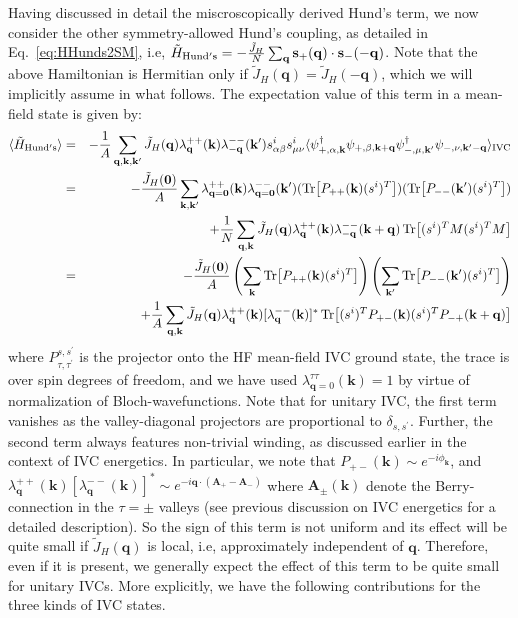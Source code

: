 \documentclass[aps,pra,twocolumn,superscriptaddress,10pt,article,nofootinbib,showpacs,longbibliography]{revtex4-1}
\def \k{{\mathbf k}}
\def \q{{\mathbf q}}
\def \s{{\mathbf s}}
\def \beq{\begin{eqnarray}}
\def \eeq{\end{eqnarray}}
\def \nn{\nonumber \\}
\begin{document}
Having discussed in detail the miscroscopically derived Hund's term, we now consider the other symmetry-allowed Hund's coupling, as detailed in Eq.~\eqref{eq:HHunds2SM}, i.e, $\tilde{H}_{\rm Hund's} = - \frac{\tilde{J}_H}{N} \sum_{\q} \s_{+}(\q) \cdot \s_{-}(-\q)$. 
Note that the above Hamiltonian is Hermitian only if $\tilde{J}_H(\q)= \tilde{J}_H(-\q)$, which we will implicitly assume in what follows. The expectation value of this term in a mean-field state is given by:
\beq
\langle \tilde{H}_{\rm Hund's} \rangle &=& - \frac{1}{A} \sum_{\q, \k, \k^\prime} \tilde{J}_H(\q) \lambda^{++}_\q(\k) \lambda^{--}_{-\q}(\k^\prime) s^i_{\alpha \beta} s^i_{\mu \nu} \langle \psi^\dagger_{+,\alpha,\k} \psi_{+,\beta, \k + \q} \psi^\dagger_{-,\mu,\k^\prime} \psi_{-,\nu,\k^\prime - \q} \rangle_{\rm IVC} \nn
& =& - \frac{\tilde{J}_H(\mathbf{0})}{A} \sum_{\k, \k^\prime} \lambda^{++}_{\q = \mathbf{0}}(\k) \lambda^{--}_{\q = \mathbf{0}}(\k^\prime)   (\Tr[P_{++}(\k)(s^i)^T] ) (\Tr[P_{--}(\k^\prime) (s^i)^T] ) \nn 
&& + \frac{1}{N} \sum_{\q, \k} \tilde{J}_H(\q) \lambda^{++}_{\q}(\k) \lambda^{--}_{-\q}(\k+\q) \Tr[(s^i)^T M (s^i)^T M] \nn
& = & -\frac{\tilde{J}_H(\mathbf{0})}{A} \left( \sum_{\k}  \Tr[P_{++}(\k)(s^i)^T] \right) \left( \sum_{\k^\prime} \Tr[P_{--}(\k^\prime)(s^i)^T] \right)  \nn
& & + \frac{1}{A} \sum_{\q, \k} \tilde{J}_H(\q) \lambda^{++}_{\q}(\k) [\lambda^{--}_{\q}(\k)]^* \Tr[(s^i)^T P_{+-}(\k) (s^i)^T P_{-+}(\k + \q)] 
\eeq
where $P^{s,s^\prime}_{\tau,\tau^\prime}$ is the projector onto the HF mean-field IVC ground state, the trace is over spin degrees of freedom, and we have used $\lambda^{\tau \tau}_{\q = 0}(\k) = 1$ by virtue of normalization of Bloch-wavefunctions.
Note that for unitary IVC, the first term vanishes as the valley-diagonal projectors are proportional to $\delta_{s,s^\prime}$. 
Further, the second term always features non-trivial winding, as discussed earlier in the context of IVC energetics.
In particular, we note that $P_{+-}(\k) \sim e^{-i \phi_\k}$, and $\lambda^{++}_{\q}(\k) [\lambda^{--}_{\q}(\k)]^* \sim e^{- i \q \cdot (\bm{A}_+ - \bm{A}_-)}$ where $\bm{A}_\pm(\k)$ denote the Berry-connection in the $\tau = \pm$ valleys (see previous discussion on IVC energetics for a detailed description).
So the sign of this term is not uniform and its effect will be quite small if $\tilde{J}_H(\q)$ is local, i.e, approximately independent of $\q$. 
Therefore, even if it is present, we generally expect the effect of this term to be quite small for unitary IVCs. 
More explicitly, we have the following contributions for the three kinds of IVC states.
\end{document}
